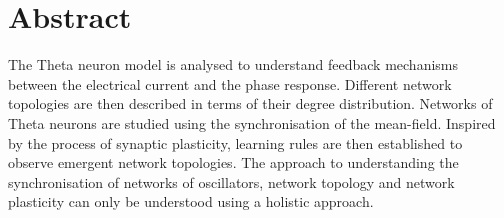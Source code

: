 



\mainmatter


\tableofcontents

\section*{Abstract}
The Theta neuron model is analysed to understand feedback mechanisms between the electrical current and the phase response. Different network topologies are then described in terms of their degree distribution. Networks of Theta neurons are studied using the synchronisation of the mean-field. Inspired by the process of synaptic plasticity, learning rules are then established to observe emergent network topologies. The approach to understanding the synchronisation of networks of oscillators, network topology and network plasticity can only be understood using a holistic approach.

%





\renewcommand{\thepage}{\arabic{page}}









\newpage

\small{}




